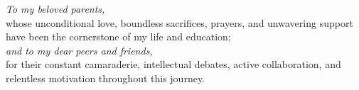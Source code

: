 
\begin{dedication}

\vspace*{2cm}
\begin{center}
\textit{To my beloved parents,}\\
\vspace{0.5cm}
whose unconditional love, boundless sacrifices, prayers, and unwavering support have been the cornerstone of my life and education;\\

\vspace{1.5cm}
\textit{and to my dear peers and friends,}\\
\vspace{0.5cm}
for their constant camaraderie, intellectual debates, active collaboration, and relentless motivation throughout this journey.
\end{center}

\end{dedication}
